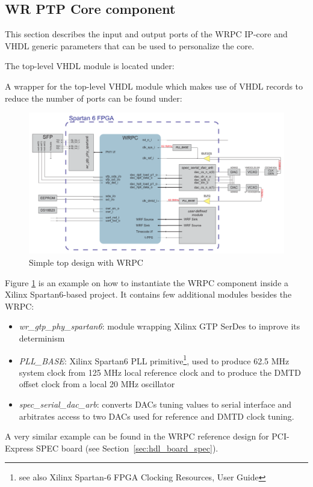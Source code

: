 \subsection{WR PTP Core component}
\label{sec:hdl_wrpc}
This section describes the input and output ports of the WRPC IP-core and VHDL generic parameters
that can be used to personalize the core.

The top-level VHDL module is located under:\\

A wrapper for the top-level VHDL module which makes use of VHDL records to reduce the number of
ports can be found under:\\

\begin{figure}
  \begin{center}
    \includegraphics[width=.9\textheight, angle=270]{fig/basic_top.pdf}
    \caption{Simple top design with WRPC}
    \label{intro:fig:wrpc_top}
  \end{center}
\end{figure}

Figure \ref{intro:fig:wrpc_top} is an example on how to instantiate the WRPC component inside a
Xilinx Spartan6-based project. It contains few additional modules besides the WRPC:
\begin{itemize}
  \item \emph{wr\_gtp\_phy\_spartan6}: module wrapping Xilinx GTP SerDes to improve its determinism
  \item \emph{PLL\_BASE}: Xilinx Spartan6 PLL primitive\footnote{see also Xilinx Spartan-6 FPGA
    Clocking Resources, User Guide}, used to produce 62.5 MHz system clock from 125 MHz local
    reference clock and to produce the DMTD offset clock from a local 20 MHz oscillator
  \item \emph{spec\_serial\_dac\_arb}: converts DACs tuning values to serial interface and
    arbitrates access to two DACs used for reference and DMTD clock tuning.
\end{itemize}

A very similar example can be found in the WRPC reference design for PCI-Express SPEC board (see
Section~\ref{sec:hdl_board_spec}).












